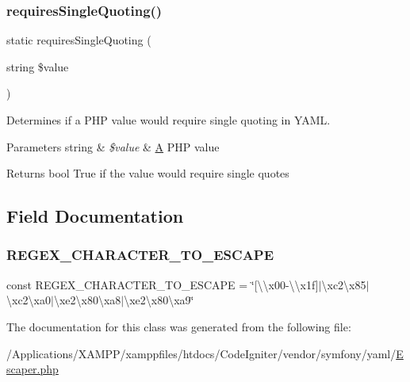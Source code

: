 \subsubsection{\texorpdfstring{requires\+Single\+Quoting()}{requiresSingleQuoting()}}
{\footnotesize\ttfamily static requires\+Single\+Quoting (\begin{DoxyParamCaption}\item[{string}]{\$value }\end{DoxyParamCaption})\hspace{0.3cm}{\ttfamily [static]}}

Determines if a P\+HP value would require single quoting in Y\+A\+ML.


\begin{DoxyParams}[1]{Parameters}
string & {\em \$value} & \mbox{\hyperlink{class_a}{A}} P\+HP value\\
\hline
\end{DoxyParams}
\begin{DoxyReturn}{Returns}
bool True if the value would require single quotes 
\end{DoxyReturn}


\subsection{Field Documentation}
\mbox{\label{class_symfony_1_1_component_1_1_yaml_1_1_escaper_a35ce88401a0b249e400659276c997046}} 
\subsubsection{\texorpdfstring{R\+E\+G\+E\+X\+\_\+\+C\+H\+A\+R\+A\+C\+T\+E\+R\+\_\+\+T\+O\+\_\+\+E\+S\+C\+A\+PE}{REGEX\_CHARACTER\_TO\_ESCAPE}}
{\footnotesize\ttfamily const R\+E\+G\+E\+X\+\_\+\+C\+H\+A\+R\+A\+C\+T\+E\+R\+\_\+\+T\+O\+\_\+\+E\+S\+C\+A\+PE = \char`\"{}\mbox{[}\textbackslash{}\textbackslash{}x00-\/\textbackslash{}\textbackslash{}x1f\mbox{]}$\vert$\textbackslash{}xc2\textbackslash{}x85$\vert$\textbackslash{}xc2\textbackslash{}xa0$\vert$\textbackslash{}xe2\textbackslash{}x80\textbackslash{}xa8$\vert$\textbackslash{}xe2\textbackslash{}x80\textbackslash{}xa9\char`\"{}}



The documentation for this class was generated from the following file\+:\begin{DoxyCompactItemize}
\item 
/\+Applications/\+X\+A\+M\+P\+P/xamppfiles/htdocs/\+Code\+Igniter/vendor/symfony/yaml/\mbox{\hyperlink{_escaper_8php}{Escaper.\+php}}\end{DoxyCompactItemize}
